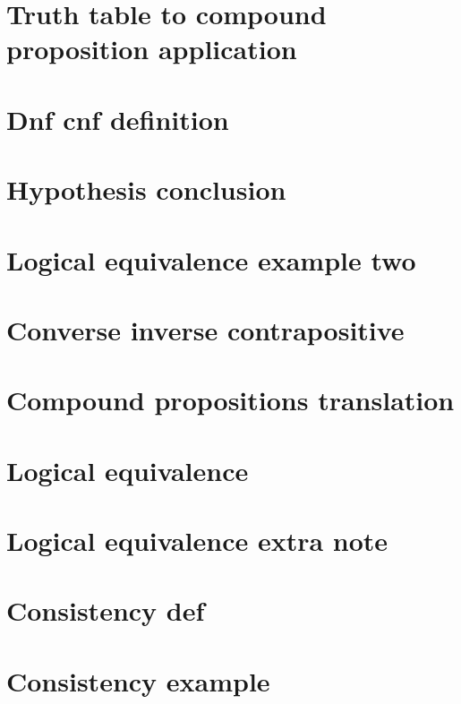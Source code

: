 \section*{Truth table to compound proposition application}

\vfill
\section*{Dnf cnf definition}

\vfill
\section*{Hypothesis conclusion}

\vfill
\section*{Logical equivalence example two}

\vfill
\section*{Converse inverse contrapositive}

\vfill
\section*{Compound propositions translation}

\vfill
\section*{Logical equivalence}

\vfill
\section*{Logical equivalence extra note}

\vfill
\section*{Consistency def}

\vfill
\section*{Consistency example}

\vfill
